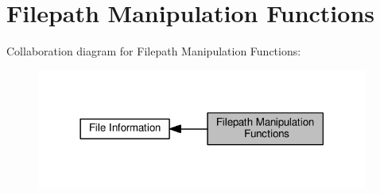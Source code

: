 \hypertarget{group__apr__filepath}{}\section{Filepath Manipulation Functions}
\label{group__apr__filepath}
Collaboration diagram for Filepath Manipulation Functions\+:
\nopagebreak
\begin{figure}[H]
\begin{center}
\leavevmode
\includegraphics[width=309pt]{group__apr__filepath}
\end{center}
\end{figure}
